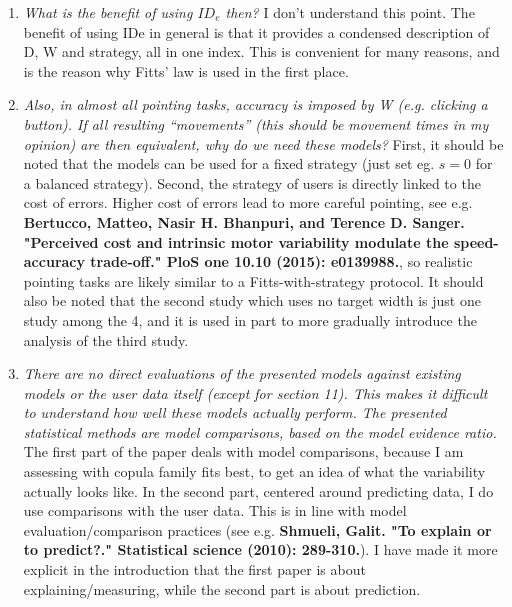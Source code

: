 \documentclass{article}
\begin{document}
\begin{enumerate}
    \item \textit{What is the benefit of using $ID_e$ then?} I don't understand this point. The benefit of using IDe in general is that it provides a condensed description of D, W and strategy, all in one index. This is convenient for many reasons, and is the reason why Fitts' law is used in the first place.
    \item \textit{ Also, in almost all pointing tasks, accuracy is imposed by W (e.g. clicking a button). If all resulting “movements” (this should be movement times in my opinion) are then equivalent, why do we need these models?} First, it should be noted that the models can be used for a fixed strategy (just set eg. $s=0$ for a balanced strategy). Second, the strategy of users is directly linked to the cost of errors. Higher cost of errors lead to more careful pointing, see e.g. \textbf{Bertucco, Matteo, Nasir H. Bhanpuri, and Terence D. Sanger. "Perceived cost and intrinsic motor variability modulate the speed-accuracy trade-off." PloS one 10.10 (2015): e0139988.}, so realistic pointing tasks are likely similar to a Fitts-with-strategy protocol. It should also be noted that the second study which uses no target width is just one study among the 4, and it is used in part to more gradually introduce the analysis of the third study.
    \item \textit{There are no direct evaluations of the presented models against existing models or the user data itself (except for section 11). This makes it difficult to understand how well these models actually perform. The presented statistical methods are model comparisons, based on the model evidence ratio.} The first part of the paper deals with model comparisons, because I am assessing with copula family fits best, to get an idea of what the variability actually looks like. In the second part, centered around predicting data, I do use comparisons with the user data. This is in line with model evaluation/comparison practices (see e.g. \textbf{Shmueli, Galit. "To explain or to predict?." Statistical science (2010): 289-310.}). I have made it more explicit in the introduction that the first paper is about explaining/measuring, while the second part is about prediction.

\end{enumerate}
\end{document}

